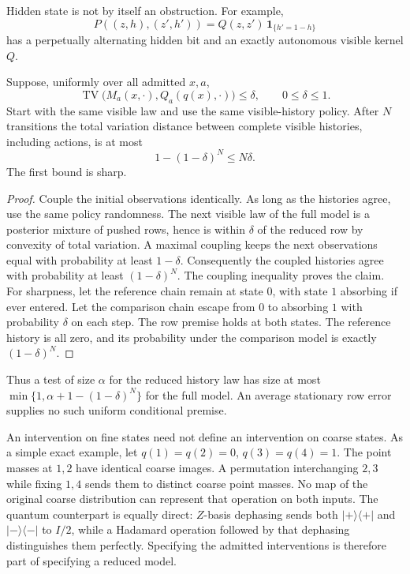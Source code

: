 Hidden state is not by itself an obstruction.  For example,
\[
 P((z,h),(z',h'))=Q(z,z')\,\mathbf1_{\{h'=1-h\}}
\]
has a perpetually alternating hidden bit and an exactly autonomous visible
kernel \(Q\).

\begin{theorem}
\label{op:history-bound}
Suppose, uniformly over all admitted \(x,a\),
\[
 \operatorname{TV}\bigl(M_a(x,\cdot),Q_a(q(x),\cdot)\bigr)\le\delta,
 \qquad 0\le\delta\le1.
\]
Start with the same visible law and use the same visible-history policy.
After \(N\) transitions the total variation distance between complete
visible histories, including actions, is at most
\[
 1-(1-\delta)^N\le N\delta .
\]
The first bound is sharp.
\end{theorem}
\begin{proof}
Couple the initial observations identically.  As long as the histories
agree, use the same policy randomness.  The next visible law of the full
model is a posterior mixture of pushed rows, hence is within \(\delta\)
of the reduced row by convexity of total variation.  A maximal coupling
keeps the next observations equal with probability at least \(1-\delta\).
Consequently the coupled histories agree with probability at least
\((1-\delta)^N\).  The coupling inequality proves the claim.
For sharpness, let the reference chain remain at state \(0\), with state
\(1\) absorbing if ever entered.  Let the comparison chain escape from
\(0\) to absorbing \(1\) with probability \(\delta\) on each step.
The row premise holds at both states.  The reference history is all zero,
and its probability under the comparison model is exactly
\((1-\delta)^N\).
\end{proof}

Thus a test of size \(\alpha\) for the reduced history law has size at most
\(\min\{1,\alpha+1-(1-\delta)^N\}\) for the full model.  An average
stationary row error supplies no such uniform conditional premise.

An intervention on fine states need not define an intervention on coarse
states.  As a simple exact example, let \(q(1)=q(2)=0\), \(q(3)=q(4)=1\).
The point masses at \(1,2\) have identical coarse images.  A permutation
interchanging \(2,3\) while fixing \(1,4\) sends them to distinct coarse
point masses.  No map of the original coarse distribution can represent
that operation on both inputs.  The quantum counterpart is equally direct:
\(Z\)-basis dephasing sends both \(|+\rangle\langle+|\) and
\(|-\rangle\langle-|\) to \(I/2\), while a Hadamard operation followed by
that dephasing distinguishes them perfectly.  Specifying the admitted
interventions is therefore part of specifying a reduced model.

